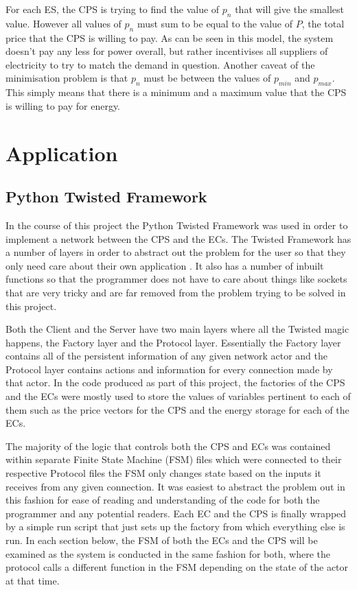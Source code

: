 \documentclass[a4paper, notitlepage]{report}
\begin{document}
For each ES, the CPS is trying to find the value of \(p_n\) that will give the
smallest value. However all values of \(p_n\) must sum to be equal to the value of
\(P\), the total price that the CPS is willing to pay. As can be seen in this
model, the system doesn't pay any less for power overall, but rather
incentivises all suppliers of electricity to try to match the demand in
question. Another caveat of the minimisation problem is that \(p_n\) must be
between the values of \(p_{min}\) and \(p_{max}\). This simply means that there is a
minimum and a maximum value that the CPS is willing to pay for energy.
\chapter{Application}
\label{sec:org7411f74}
\section{Python Twisted Framework}
\label{sec:org972bf08}
In the course of this project the Python Twisted Framework \cite{twistedpython}
was used in order to implement a network between the CPS and the ECs. The
Twisted Framework has a number of layers in order to abstract out the problem
for the user so that they only need care about their own application
\cite{kinder2005event}. It also has a number of inbuilt functions so that the
programmer does not have to care about things like sockets that are very tricky
and are far removed from the problem trying to be solved in this project.

Both the Client and the Server have two main layers where all the Twisted magic
happens, the Factory layer and the Protocol layer. Essentially the Factory layer
contains all of the persistent information of any given network actor and the
Protocol layer contains actions and information for every connection made by
that actor. In the code produced as part of this project, the factories of the
CPS and the ECs were mostly used to store the values of variables pertinent to
each of them such as the price vectors for the CPS and the energy storage for
each of the ECs.

The majority of the logic that controls both the CPS and ECs was contained
within separate Finite State Machine (FSM) files which were connected to their
respective Protocol files the FSM only changes state based on the inputs it
receives from any given connection. It was easiest to abstract the problem out
in this fashion for ease of reading and understanding of the code for both the
programmer and any potential readers. Each EC and the CPS is finally wrapped by
a simple run script that just sets up the factory from which everything else is
run. In each section below, the FSM of both the ECs and the CPS will be examined
as the system is conducted in the same fashion for both, where the protocol
calls a different function in the FSM depending on the state of the actor at
that time.
\end{document}
